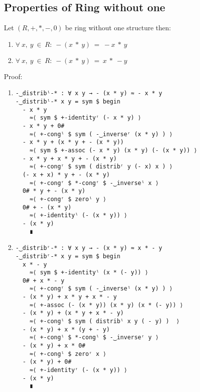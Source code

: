 \subsection{Properties of Ring without one}
Let $(R, +, *, -, 0)$ be ring without one structure then:
\begin{enumerate}
\item \(\forall\ x,\ y\ \in\ R:\ - (x\ *\ y)\ =\ - x\ *\ y\)
\item \(\forall\ x,\ y\ \in\ R:\ - (x\ *\ y)\ =\ x\ *\ - y\)
\end{enumerate}
Proof:
\begin{enumerate}
\item
\begin{verbatim}
-‿distribˡ-* : ∀ x y → - (x * y) ≈ - x * y
-‿distribˡ-* x y = sym $ begin
  - x * y                        
	≈⟨ sym $ +-identityʳ (- x * y) ⟩
  - x * y + 0#                   
	≈⟨ +-congˡ $ sym ( -‿inverseʳ (x * y) ) ⟩
  - x * y + (x * y + - (x * y))  
	≈⟨ sym $ +-assoc (- x * y) (x * y) (- (x * y)) ⟩
  - x * y + x * y + - (x * y)    
	≈⟨ +-congʳ $ sym ( distribʳ y (- x) x ) ⟩
  (- x + x) * y + - (x * y)      
	≈⟨ +-congʳ $ *-congʳ $ -‿inverseˡ x ⟩
  0# * y + - (x * y)             
	≈⟨ +-congʳ $ zeroˡ y ⟩
  0# + - (x * y)                 
	≈⟨ +-identityˡ (- (x * y)) ⟩
  - (x * y)                      
	∎
\end{verbatim}
\item
\begin{verbatim}
-‿distribʳ-* : ∀ x y → - (x * y) ≈ x * - y
-‿distribʳ-* x y = sym $ begin
  x * - y                        
	≈⟨ sym $ +-identityˡ (x * (- y)) ⟩
  0# + x * - y                   
	≈⟨ +-congʳ $ sym ( -‿inverseˡ (x * y) ) ⟩
  - (x * y) + x * y + x * - y    
	≈⟨ +-assoc (- (x * y)) (x * y) (x * (- y)) ⟩
  - (x * y) + (x * y + x * - y)  
	≈⟨ +-congˡ $ sym ( distribˡ x y ( - y) )  ⟩
  - (x * y) + x * (y + - y)      
	≈⟨ +-congˡ $ *-congˡ $ -‿inverseʳ y ⟩
  - (x * y) + x * 0#             
	≈⟨ +-congˡ $ zeroʳ x ⟩
  - (x * y) + 0#                 
	≈⟨ +-identityʳ (- (x * y)) ⟩
  - (x * y)                      
	∎
\end{verbatim}
\end{enumerate}
